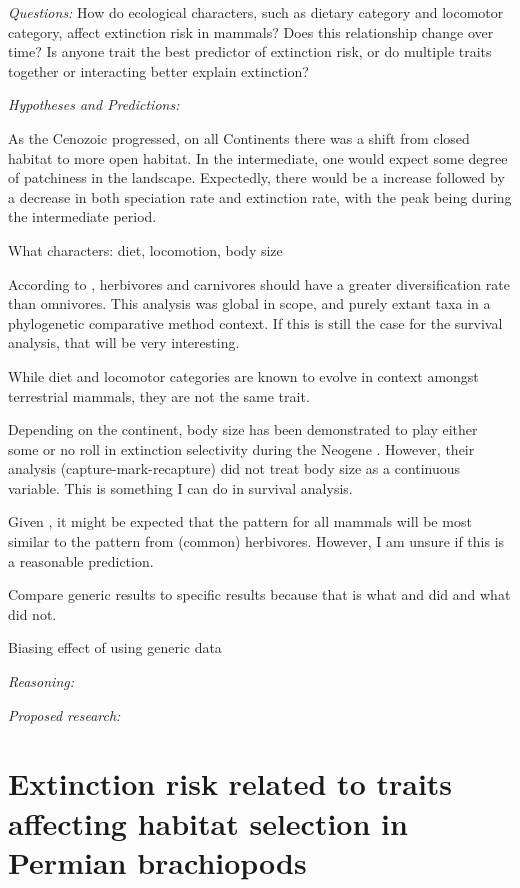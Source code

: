 \documentclass[12pt,letterpaper]{article}
\begin{document}
\textit{Questions:} How do ecological characters, such as dietary category and locomotor category, affect extinction risk in mammals? Does this relationship change over time? Is anyone trait the best predictor of extinction risk, or do multiple traits together or interacting better explain extinction?

\textit{Hypotheses and Predictions:} 

As the Cenozoic progressed, on all Continents there was a shift from closed habitat to more open habitat. In the intermediate, one would expect some degree of patchiness in the landscape. Expectedly, there would be a increase followed by a decrease in both speciation rate and extinction rate, with the peak being during the intermediate period.

What characters: diet, locomotion, body size

According to \citet{Price2012}, herbivores and carnivores should have a greater diversification rate than omnivores. This analysis was global in scope, and purely extant taxa in a phylogenetic comparative method context. If this is still the case for the survival analysis, that will be very interesting.

While diet and locomotor categories are known to evolve in context amongst terrestrial mammals, they are not the same trait.

Depending on the continent, body size has been demonstrated to play either some or no roll in extinction selectivity during the Neogene \citep{Tomiya2013,Liow2008,Liow2009}. However, their analysis (capture-mark-recapture) did not treat body size as a continuous variable. This is something I can do in survival analysis.

Given \citep{Jernvall2002}, it might be expected that the pattern for all mammals will be most similar to the pattern from (common) herbivores. However, I am unsure if this is a reasonable prediction.

Compare generic results to specific results because that is what \citet{Jernvall2002} and \citet{Jernvall2004} did and what \citet{Tomiya2013} did not.

Biasing effect of using generic data \citep{Raup1975}

\textit{Reasoning:}

\textit{Proposed research:}


\section{Extinction risk related to traits affecting habitat selection in Permian brachiopods}
\end{document}
